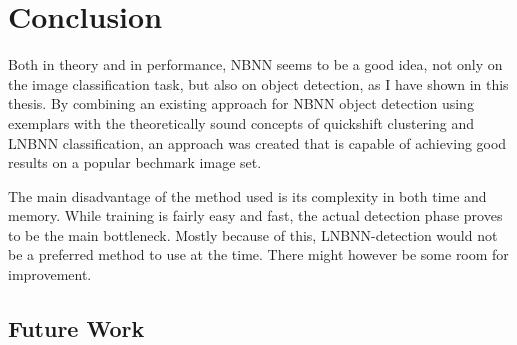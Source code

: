 
\section{Conclusion} %
\label{cha:conclusion}

Both in theory and in performance, NBNN seems to be a good idea, not only on the image classification task, but also on object detection, as I have shown in this thesis. By combining an existing approach for NBNN object detection using exemplars with the theoretically sound concepts of quickshift clustering and LNBNN classification, an approach was created that is capable of achieving good results on a popular bechmark image set.

The main disadvantage of the method used is its complexity in both time and memory. While training is fairly easy and fast, the actual detection phase proves to be the main bottleneck. Mostly because of this, LNBNN-detection would not be a preferred method to use at the time. There might however be some room for improvement.

\subsection{Future Work} %
\label{sec:future_work}





